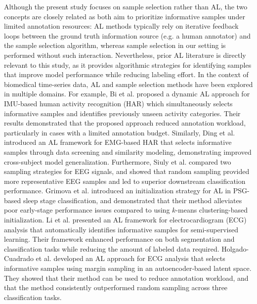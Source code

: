 \documentclass[a4paper,fleqn]{cas-dc}
\begin{document}
Although the present study focuses on sample selection rather than AL, the two concepts are closely related as both aim to prioritize informative samples under limited annotation resources: AL methods typically rely on iterative feedback loops between the ground truth information source (e.g. a human annotator) and the sample selection algorithm, whereas sample selection in our setting is performed without such interaction. Nevertheless, prior AL literature is directly relevant to this study, as it provides algorithmic strategies for identifying samples that improve model performance while reducing labeling effort. In the context of biomedical time-series data, AL and sample selection methods have been explored in multiple domains. For example, Bi et al. \cite{dynamic_al_imu_har} proposed a dynamic AL approach for IMU-based human activity recognition (HAR) which simultaneously selects informative samples and identifies previously unseen activity categories. Their results demonstrated that the proposed approach reduced annotation workload, particularly in cases with a limited annotation budget. Similarly, Ding et al. \cite{al_emg_har} introduced an AL framework for EMG-based HAR that selects informative samples through data screening and similarity modeling, demonstrating improved cross-subject model generalization. Furthermore, Siuly et al. \cite{eeg_sample_selection} compared two sampling strategies for EEG signals, and showed that random sampling provided more representative EEG samples and led to superior downstream classification performance. Grimova et al. \cite{psg_al_initialization} introduced an initialization strategy for AL in PSG-based sleep stage classification, and demonstrated that their method alleviates poor early-stage performance issues compared to using $k$-means clustering-based initialization. Li et al. \cite{al_semisupervised_ecg} presented an AL framework for electrocardiogram (ECG) analysis that automatically identifies informative samples for semi-supervised learning. Their framework enhanced performance on both segmentation and classification tasks while reducing the amount of labeled data required. Holgado-Cuadrado et al. \cite{al_long_term_ecg} developed an AL approach for ECG analysis that selects informative samples using margin sampling in an autoencoder‑based latent space. They showed that their method can be used to reduce annotation workload, and that the method consistently outperformed random sampling across three classification tasks.
\end{document}
